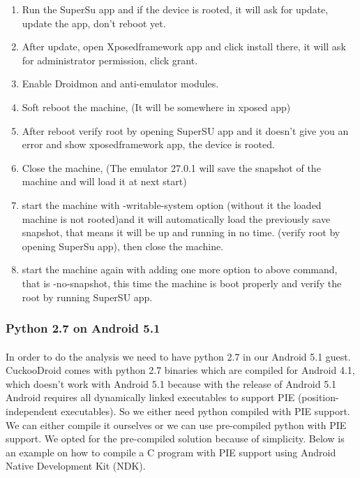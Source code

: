 \documentclass[../main.tex]{subfile}
\begin{document}
\begin{enumerate}
		\item Run the SuperSu app and if the device is rooted, it will ask for update, update the app, don't reboot yet.
		\item After update, open Xposedframework app and click install there, it will ask for administrator permission, click grant.
		\item Enable Droidmon and anti-emulator modules.
		\item Soft reboot the machine, (It will be somewhere in xposed app)
		\item After reboot verify root by opening SuperSU app and it doesn't give you an error and show xposedframework app, the device is rooted.
		\item Close the machine, (The emulator 27.0.1 will save the snapshot of the machine and will load it at next start)
		\item start the machine with -writable-system option (without it the loaded machine is not rooted)and it will automatically load the previously save snapshot, that means it will be up and running in no time. (verify root by opening SuperSu app), then close the machine.
		\item start the machine again with adding one more option to above command, that is -no-snapshot, this time the machine is boot properly and verify the root by running SuperSU app.
					
		\end{enumerate}
		\subsubsection{Python 2.7 on Android 5.1} \label{sec:android_5.1_python}
		\paragraph{} In order to do the analysis we need to have python 2.7 in our Android 5.1 guest. CuckooDroid comes with python 2.7 binaries which are compiled for Android 4.1, which doesn't work with Android 5.1 because with the release of Android 5.1 Android requires all dynamically linked executables to support PIE (position-independent executables). So we either need python compiled with PIE support. We can either compile it ourselves or we can use pre-compiled python with PIE support. We opted for the pre-compiled solution because of simplicity. Below is an example on how to compile a C program with PIE support using Android Native Development Kit (NDK).
		
\end{document}
